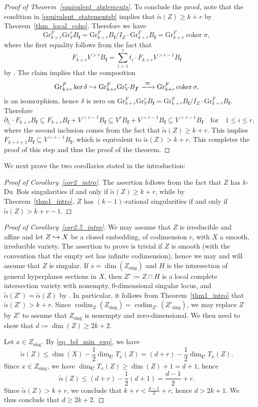 \documentclass[JEP,XML,SOM,Unicode]{cedram}
\newcommand{\To}[1]{\mathchoice{\xrightarrow{\textstyle\kern4pt#1\kern3pt}}{\stackrel{#1}{\longrightarrow}}{}{}}
\newcommand\hto{\mathrel{\lhook\joinrel\to}}
\theoremstyle{plain}
\theoremstyle{definition}
\newcommand\C{{\mathbf C}}
\newcommand\bff{{\boldsymbol f}}
\newcommand\gr{\mathrm{Gr}}
\newcommand\sing{\mathrm{sing}}
\DeclareMathOperator{\codim}{codim}
\DeclareMathOperator{\coker}{coker}
\begin{document}
\begin{proof}[Proof of Theorem~\ref{equivalent_statements}]
To conclude the proof, note that the condition in \eqref{equivalent_statementsb} implies that $\widetilde\alpha(Z)\geq k+r$ by
Theorem~\ref{thm_local_coho}. Therefore we have
\[\gr^F_{k+r}\gr^r_VB_\bff=\gr^F_{k+r}B_\bff/I_Z\cdot \gr^F_{k+r}B_\bff=\gr^F_{k+r} \coker\sigma,\]
where the first equality follows from the fact that
\[F_{k+r}V^{>r}B_{\bff}=\sum_{i=1}^r t_i\cdot F_{k+r}V^{>r-1}B_{\bff}\]
by \cite[Th.\,1.1]{CD}.
The claim implies that the composition
\[
\gr^F_{k+r}\ker\delta\hto \gr^F_{k+r}\gr^r_VB_\bff \To{=} \gr^F_{k+r} \coker\sigma,
\]
is an isomorphism, hence
$\delta$ is zero on $\gr^F_{k+r}\gr^r_V B_\bff=\gr^F_{k+r} B_\bff/I_Z\cdot\gr^F_{k+r} B_\bff$. Therefore
\[\partial_{t_i}\cdot F_{k+r}B_{\bff}\subseteq F_{k+r}B_{\bff}+V^{>r-1}B_{\bff}\subseteq V^rB_{\bff}+V^{>r-1}B_{\bff}\subseteq V^{>r-1}B_{\bff}\quad \text{for}\quad 1\leq i\leq r,\]
where the second inclusion comes from the fact that $\widetilde{\alpha}(Z)\geq k+r$.
This implies $F_{k+r+1}B_{\bff}\subseteq V^{>r-1}B_{\bff}$, which is equivalent to $\widetilde{\alpha}(Z)>k+r$.
This completes the proof of this step and thus the proof of the theorem.
\end{proof}

We next prove the two corollaries stated in the introduction:

\begin{proof}[Proof of Corollary~\ref{cor2_intro}]
The assertion follows from the fact that $Z$ has $k$-Du~Bois singularities if and only if $\widetilde{\alpha}(Z)\geq k+r$,
while by Theorem~\ref{thm1_intro}, $Z$ has $(k-1)$-rational singularities if and only if $\widetilde{\alpha}(Z)>k+r-1$.
\end{proof}

\begin{proof}[Proof of Corollary~\ref{cor2.5_intro}]
We may assume that $Z$ is irreducible and affine and let $Z\hto X$ be a closed embedding, of codimension $r$, with $X$ a smooth,
irreducible variety. The assertion to prove is trivial if $Z$ is smooth (with the convention that the empty set has infinite codimension),
hence we may and will assume that $Z$ is singular. If $s=\dim(Z_\sing)$ and
$H$ is the intersection of general hyperplanes sections in $X$, then $Z':=Z\cap H$ is a local complete intersection variety
with nonempty, $0$-dimensional singular locus,
and $\widetilde{\alpha}(Z')=\widetilde{\alpha}(Z)$ by \cite[Th.\,1.2]{CDMO}. In particular, it follows from
Theorem~\ref{thm1_intro} that $\widetilde{\alpha}(Z')>k+r$.
Since $\codim_Z(Z_\sing)=\codim_{Z'}(Z'_\sing)$, we may
replace $Z$ by $Z'$ to assume that
$Z_\sing$ is nonempty and zero-dimensional. We then need to show that $d:=\dim(Z)\geq 2k+2$.

Let $x\in Z_\sing$. By \eqref{eq_bd_min_exp}, we have
\[
\widetilde{\alpha}(Z) \leq \dim(X)-\frac{1}{2}\dim_{\C}T_x(Z)=(d+r)-\frac{1}{2}\dim_{\C}T_x(Z).
\]
Since $x\in Z_\sing$, we have $\dim_{\C}T_x(Z) \geq \dim(Z)+1=d+1$, hence
\[
\widetilde \alpha(Z) \leq (d+r)-\frac{1}{2}(d+1)=\frac{d-1}{2}+r.
\]
Since $\widetilde\alpha(Z)> k+r$, we conclude that $k+r<\frac{d-1}{2}+r$, hence $d>2k+1$.
We thus conclude that $d\geq 2k+2$.
\end{proof}
\end{document}
